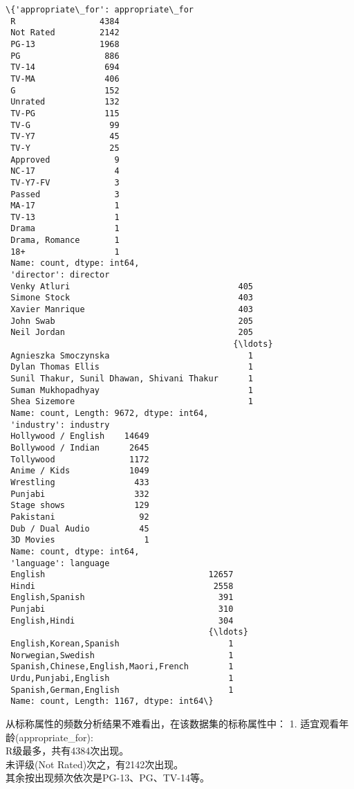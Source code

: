 \documentclass[11pt]{article}
\makeatletter
\newcommand{\boxspacing}{\kern\kvtcb@left@rule\kern\kvtcb@boxsep}
\newcommand{\prompt}[4]{
        {\ttfamily\llap{{\color{#2}[#3]:\hspace{3pt}#4}}\vspace{-\baselineskip}}
    }
\makeatother
\begin{document}
            \begin{tcolorbox}[breakable, size=fbox, boxrule=.5pt, pad at break*=1mm, opacityfill=0]
\prompt{Out}{outcolor}{27}{\boxspacing}
\begin{Verbatim}[commandchars=\\\{\}]
\{'appropriate\_for': appropriate\_for
 R                 4384
 Not Rated         2142
 PG-13             1968
 PG                 886
 TV-14              694
 TV-MA              406
 G                  152
 Unrated            132
 TV-PG              115
 TV-G                99
 TV-Y7               45
 TV-Y                25
 Approved             9
 NC-17                4
 TV-Y7-FV             3
 Passed               3
 MA-17                1
 TV-13                1
 Drama                1
 Drama, Romance       1
 18+                  1
 Name: count, dtype: int64,
 'director': director
 Venky Atluri                                  405
 Simone Stock                                  403
 Xavier Manrique                               403
 John Swab                                     205
 Neil Jordan                                   205
                                              {\ldots}
 Agnieszka Smoczynska                            1
 Dylan Thomas Ellis                              1
 Sunil Thakur, Sunil Dhawan, Shivani Thakur      1
 Suman Mukhopadhyay                              1
 Shea Sizemore                                   1
 Name: count, Length: 9672, dtype: int64,
 'industry': industry
 Hollywood / English    14649
 Bollywood / Indian      2645
 Tollywood               1172
 Anime / Kids            1049
 Wrestling                433
 Punjabi                  332
 Stage shows              129
 Pakistani                 92
 Dub / Dual Audio          45
 3D Movies                  1
 Name: count, dtype: int64,
 'language': language
 English                                 12657
 Hindi                                    2558
 English,Spanish                           391
 Punjabi                                   310
 English,Hindi                             304
                                         {\ldots}
 English,Korean,Spanish                      1
 Norwegian,Swedish                           1
 Spanish,Chinese,English,Maori,French        1
 Urdu,Punjabi,English                        1
 Spanish,German,English                      1
 Name: count, Length: 1167, dtype: int64\}
\end{Verbatim}
\end{tcolorbox}
        
    从标称属性的频数分析结果不难看出，在该数据集的标称属性中： 1.
适宜观看年龄(appropriate\_for):\\
R级最多，共有4384次出现。\\
未评级(Not Rated)次之，有2142次出现。\\
其余按出现频次依次是PG-13、PG、TV-14等。
\end{document}
